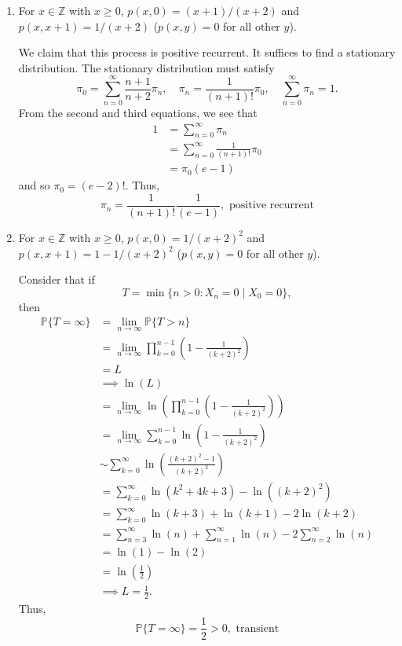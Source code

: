 \documentclass[11pt]{article}
\newcommand{\bbP}{\mathbb{P}}
\begin{document}
\begin{enumerate}[label=(\alph*)]
    \item For \(x\in\mathbb{Z}\) with \(x\geq 0\), \(p(x,0)=(x+1)/(x+2)\) and \(p(x,x+1)=1/(x+2)\) (\(p(x,y)=0\) for all other \(y\)).
\begin{solution}
We claim that this process is positive recurrent. It suffices to find a stationary distribution. The stationary distribution must satisfy
\[\pi_0 = \sum_{n=0}^\infty \frac{n+1}{n+2}\pi_n, \quad \pi_n = \frac{1}{(n+1)!}\pi_0, \quad \sum_{n=0}^\infty \pi_n = 1.\] From the second and third equations, we see that 
\begin{align*}
    1 &= \sum_{n=0}^\infty \pi_n\\
    &= \sum_{n=0}^\infty \frac{1}{(n+1)!}\pi_0\\
    &= \pi_0(e-1)
\end{align*}
and so $\pi_0 = (e-2)!.$ Thus, 
\[\boxed{\pi_n = \frac{1}{(n+1)!}\frac{1}{(e-1)}, \text{ positive recurrent}}\]
\end{solution}
    
    \item For \(x\in\mathbb{Z}\) with \(x\geq 0\), \(p(x,0)=1/(x+2)^{2}\) and \(p(x,x+1)=1-1/(x+2)^{2}\) (\(p(x,y)=0\) for all other \(y\)).
\begin{solution}
    Consider that if 
    \[T = \min\{n >0 : X_n = 0 \mid X_0 = 0\},\] then 
\begin{align*}
\bbP\{T = \infty\} &= \lim_{n\to \infty} \bbP\{T >n\}\\
&= \lim_{n\to \infty} \prod_{k=0}^{n-1} (1 - \frac{1}{(k + 2)^2})\\
&= L\\
&\implies \ln(L)\\
&= \lim_{n\to \infty} \ln\left(\prod_{k=0}^{n-1} (1 - \frac{1}{(k + 2)^2})\right)\\
&= \lim_{n\to \infty}\sum_{k=0}^{n-1}\ln(1 - \frac{1}{(k+2)^2})\\
&\sim \sum_{k=0}^\infty \ln\left(\frac{(k+2)^2-1}{(k+2)^2}\right)\\
&= \sum_{k=0}^\infty \ln(k^2 + 4k + 3) - \ln((k+2)^2)\\
&= \sum_{k=0}^\infty \ln(k+3)  + \ln(k+1) - 2\ln(k+2)\\
&= \sum_{n=3}^\infty \ln(n) + \sum_{n=1}^\infty \ln(n) -2 \sum_{n=2}^\infty\ln(n)\\
&= \ln(1) - \ln(2)\\
&= \ln(\frac{1}{2})\\
&\implies L = \frac{1}{2}.
\end{align*}
Thus, 
\[\boxed{\bbP\{T = \infty\} = \frac{1}{2}>0, \text{ transient}}\]

\end{solution}
\end{enumerate}
\end{document}
